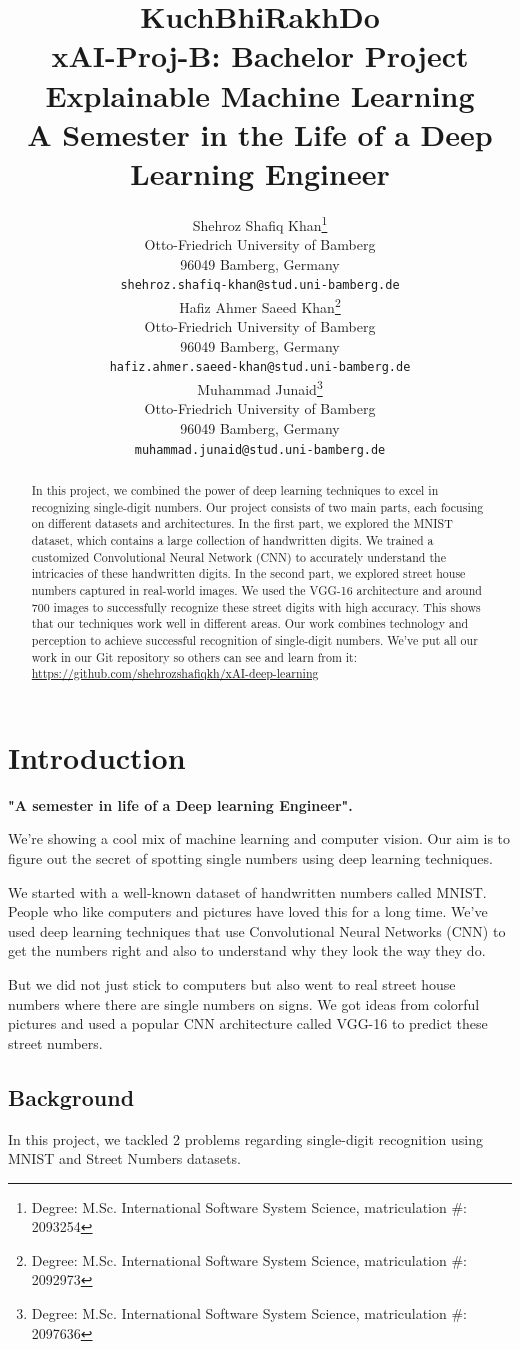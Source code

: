 \documentclass[12pt,a4paper]{article}
\title{ KuchBhiRakhDo \\ {\large xAI-Proj-B: Bachelor Project Explainable Machine Learning } \\ {\large A Semester in the Life of a Deep Learning Engineer}}
\author{%
  Shehroz Shafiq Khan\thanks{Degree: M.Sc. International Software System Science, matriculation \#: 2093254} \\
  Otto-Friedrich University of Bamberg\\
  96049 Bamberg, Germany\\
  \texttt{shehroz.shafiq-khan@stud.uni-bamberg.de}\\
   \And
   Hafiz Ahmer Saeed Khan\thanks{Degree: M.Sc. International Software System Science, matriculation \#: 2092973}\\
   Otto-Friedrich University of Bamberg\\
   96049 Bamberg, Germany\\
   \texttt{hafiz.ahmer.saeed-khan@stud.uni-bamberg.de} \\
   \And
   Muhammad Junaid\thanks{Degree: M.Sc. International Software System Science, matriculation \#: 2097636}\\
   Otto-Friedrich University of Bamberg\\
   96049 Bamberg, Germany\\
   \texttt{muhammad.junaid@stud.uni-bamberg.de} \\
}
\begin{document}
\maketitle
\def\va{{\bm{a}}}
\pagebreak
\begin{abstract}
In this project, we combined the power of deep learning techniques to excel in recognizing single-digit numbers. Our project consists of two main parts, each focusing on different datasets and architectures. In the first part, we explored the MNIST dataset, which contains a large collection of handwritten digits. We trained a customized Convolutional Neural Network (CNN) to accurately understand the intricacies of these handwritten digits. In the second part, we explored street house numbers captured in real-world images. We used the VGG-16 architecture and around 700 images to successfully recognize these street digits with high accuracy. This shows that our techniques work well in different areas. Our work combines technology and perception to achieve successful recognition of single-digit numbers. We've put all our work in our Git repository so others can see and learn from it: \url{https://github.com/shehrozshafiqkh/xAI-deep-learning}
\end{abstract}


\section{Introduction}

\textbf{"A semester in life of a Deep learning Engineer".}

We're showing a cool mix of machine learning and computer vision. Our aim is to figure out the secret of spotting single numbers using deep learning techniques.

We started with a well-known dataset of handwritten numbers called MNIST. People who like computers and pictures have loved this for a long time. We've used deep learning techniques that use Convolutional Neural Networks (CNN) to get the numbers right and also to understand why they look the way they do.

But we did not just stick to computers but also went to real street house numbers where there are single numbers on signs. We got ideas from colorful pictures and used a popular CNN architecture called VGG-16 to predict these street numbers.


\subsection{Background}
In this project, we tackled 2 problems regarding single-digit recognition using MNIST and Street Numbers datasets.
\end{document}
